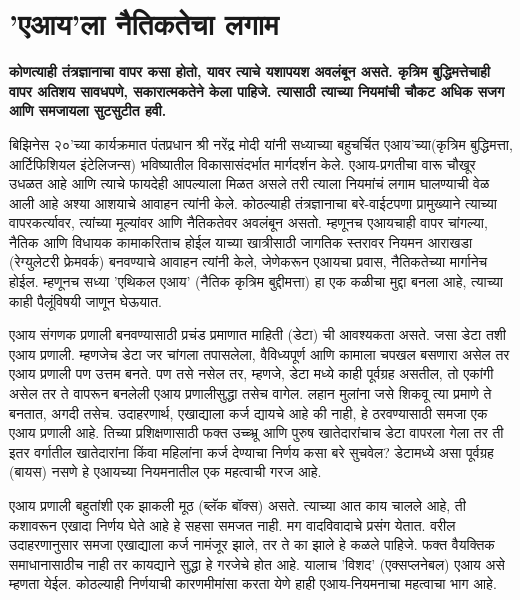 \chapter{'एआय'ला नैतिकतेचा लगाम}

{\textbf{कोणत्याही तंत्रज्ञानाचा वापर कसा होतो,  यावर त्याचे यशापयश अवलंबून असते.  कृत्रिम बुद्धिमत्तेचाही वापर अतिशय सावधपणे,  सकारात्मकतेने केला पाहिजे. त्यासाठी त्याच्या नियमांची चौकट अधिक सजग आणि समजायला सुटसुटीत हवी. }}

\vspace{1.5em}

बिझिनेस २०'च्या कार्यक्रमात पंतप्रधान श्री नरेंद्र मोदी यांनी सध्याच्या बहुचर्चित एआय'च्या(कृत्रिम बुद्धिमत्ता,  आर्टिफिशियल इंटेलिजन्स) भविष्यातील विकासासंदर्भात मार्गदर्शन केले. एआय-प्रगतीचा वारू चौखूर उधळत आहे आणि त्याचे फायदेही आपल्याला मिळत असले तरी त्याला नियमांचं लगाम घालण्याची वेळ आली आहे अश्या आशयाचे आवाहन त्यांनी केले. कोठल्याही तंत्रज्ञानाचा बरे-वाईटपणा प्रामुख्याने त्याच्या वापरकर्त्यावर, त्यांच्या मूल्यांवर आणि नैतिकतेवर अवलंबून असतो. म्हणूनच एआयचाही वापर चांगल्या, नैतिक आणि विधायक कामाकरिताच होईल याच्या खात्रीसाठी जागतिक स्तरावर नियमन आराखडा (रेग्युलेटरी फ्रेमवर्क) बनवण्याचे आवाहन त्यांनी केले, जेणेकरून एआयचा प्रवास, नैतिकतेच्या मार्गानेच होईल. म्हणूनच सध्या 'एथिकल एआय' (नैतिक कृत्रिम बुद्दीमत्ता) हा एक कळीचा मुद्दा बनला आहे, त्याच्या काही पैलूंविषयी जाणून घेऊयात.

एआय संगणक प्रणाली बनवण्यासाठी प्रचंड प्रमाणात माहिती (डेटा) ची आवश्यकता असते. जसा डेटा तशी एआय प्रणाली. म्हणजेच डेटा जर चांगला तपासलेला, वैविध्यपूर्ण आणि कामाला चपखल बसणारा असेल तर एआय प्रणाली पण उत्तम बनते. पण तसे नसेल तर, म्हणजे, डेटा मध्ये काही पूर्वग्रह असतील, तो एकांगी असेल तर ते वापरून बनलेली एआय प्रणालीसुद्धा तसेच वागेल. लहान मुलांना जसे शिकवू त्या प्रमाणे ते बनतात, अगदी तसेच. उदाहरणार्थ, एखाद्याला कर्ज द्यायचे आहे की नाही, हे ठरवण्यासाठी समजा एक एआय प्रणाली आहे. तिच्या प्रशिक्षणासाठी फक्त उच्च्भ्रू आणि पुरुष खातेदारांचाच डेटा वापरला गेला तर ती इतर वर्गातील खातेदारांना किंवा महिलांना कर्ज देण्याचा निर्णय कसा बरे सुचवेल? डेटामध्ये असा पूर्वग्रह (बायस) नसणे हे एआयच्या नियमनातील एक महत्वाची गरज आहे.

एआय प्रणाली बहुतांशी एक झाकली मूठ (ब्लॅक बॉक्स) असते. त्याच्या आत काय चालले आहे, ती कशावरून एखादा निर्णय घेते आहे हे सहसा समजत नाही. मग वादविवादाचे प्रसंग येतात. वरील उदाहरणानुसार समजा एखाद्याला कर्ज नामंजूर झाले, तर ते का झाले हे कळले पाहिजे. फक्त वैयक्तिक समाधानासाठीच नाही तर कायद्याने सुद्धा हे गरजेचे होत आहे. यालाच 'विशद' (एक्सप्लनेबल) एआय असे म्हणता येईल. कोठल्याही निर्णयाची कारणमीमांसा करता येणे हाही एआय-नियमनाचा महत्वाचा भाग आहे.

